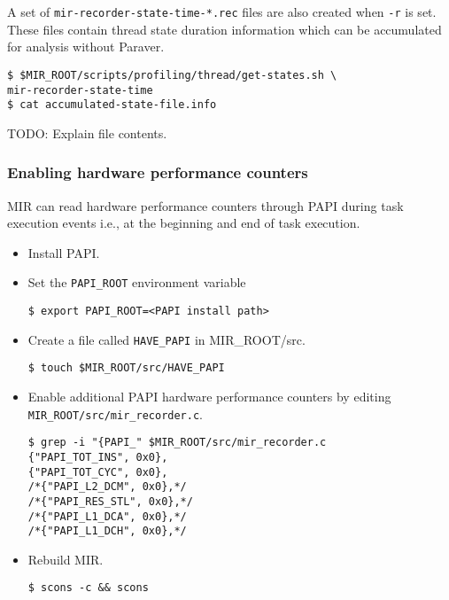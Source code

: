 \documentclass[11pt,a4paper]{article}
\begin{document}
A set of \texttt{mir-recorder-state-time-*.rec} files are also created when \texttt{-r} is set. These files contain thread state duration information which can be accumulated for analysis without Paraver.  

\begin{lstlisting}[style=MyInputStyle]
$ $MIR_ROOT/scripts/profiling/thread/get-states.sh \
mir-recorder-state-time
$ cat accumulated-state-file.info
\end{lstlisting}

TODO: Explain file contents.

\subsubsection{Enabling hardware performance counters}\label{enabling-hardware-performance-counters}

MIR can read hardware performance counters through PAPI during task execution events i.e., at the beginning and end of task execution.

\begin{itemize}
\item Install PAPI.
\item Set the \texttt{PAPI\_ROOT} environment variable

\begin{lstlisting}[style=MyInputStyle]
$ export PAPI_ROOT=<PAPI install path>
\end{lstlisting}

\item Create a file called \texttt{HAVE\_PAPI} in MIR\_ROOT/src.

\begin{lstlisting}[style=MyInputStyle]
$ touch $MIR_ROOT/src/HAVE_PAPI
\end{lstlisting}

\item Enable additional PAPI hardware performance counters by editing \texttt{MIR\_ROOT/src/mir\_recorder.c}.

\begin{lstlisting}[style=MyInputStyle]
$ grep -i "{PAPI_" $MIR_ROOT/src/mir_recorder.c
{"PAPI_TOT_INS", 0x0},
{"PAPI_TOT_CYC", 0x0},
/*{"PAPI_L2_DCM", 0x0},*/
/*{"PAPI_RES_STL", 0x0},*/
/*{"PAPI_L1_DCA", 0x0},*/
/*{"PAPI_L1_DCH", 0x0},*/
\end{lstlisting}

\item Rebuild MIR.

\begin{lstlisting}[style=MyInputStyle]
$ scons -c && scons
\end{lstlisting}
\end{itemize}
\end{document}
